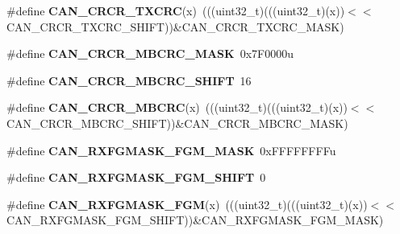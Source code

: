 \begin{DoxyCompactItemize}
\item 
\#define {\bfseries C\+A\+N\+\_\+\+C\+R\+C\+R\+\_\+\+T\+X\+C\+RC}(x)~(((uint32\+\_\+t)(((uint32\+\_\+t)(x))$<$$<$C\+A\+N\+\_\+\+C\+R\+C\+R\+\_\+\+T\+X\+C\+R\+C\+\_\+\+S\+H\+I\+FT))\&C\+A\+N\+\_\+\+C\+R\+C\+R\+\_\+\+T\+X\+C\+R\+C\+\_\+\+M\+A\+SK)\hypertarget{group__CAN__Register__Masks_ga2c7cb04502b4f8ab4f5e005dc3512ba2}{}\label{group__CAN__Register__Masks_ga2c7cb04502b4f8ab4f5e005dc3512ba2}

\item 
\#define {\bfseries C\+A\+N\+\_\+\+C\+R\+C\+R\+\_\+\+M\+B\+C\+R\+C\+\_\+\+M\+A\+SK}~0x7\+F0000u\hypertarget{group__CAN__Register__Masks_ga8b17ddaa608ead97f25b59e5919d079c}{}\label{group__CAN__Register__Masks_ga8b17ddaa608ead97f25b59e5919d079c}

\item 
\#define {\bfseries C\+A\+N\+\_\+\+C\+R\+C\+R\+\_\+\+M\+B\+C\+R\+C\+\_\+\+S\+H\+I\+FT}~16\hypertarget{group__CAN__Register__Masks_ga1d18c789e52dbae45dc581a3327a1bde}{}\label{group__CAN__Register__Masks_ga1d18c789e52dbae45dc581a3327a1bde}

\item 
\#define {\bfseries C\+A\+N\+\_\+\+C\+R\+C\+R\+\_\+\+M\+B\+C\+RC}(x)~(((uint32\+\_\+t)(((uint32\+\_\+t)(x))$<$$<$C\+A\+N\+\_\+\+C\+R\+C\+R\+\_\+\+M\+B\+C\+R\+C\+\_\+\+S\+H\+I\+FT))\&C\+A\+N\+\_\+\+C\+R\+C\+R\+\_\+\+M\+B\+C\+R\+C\+\_\+\+M\+A\+SK)\hypertarget{group__CAN__Register__Masks_gaab5690dca6900f95d513ea5178e1ad25}{}\label{group__CAN__Register__Masks_gaab5690dca6900f95d513ea5178e1ad25}

\item 
\#define {\bfseries C\+A\+N\+\_\+\+R\+X\+F\+G\+M\+A\+S\+K\+\_\+\+F\+G\+M\+\_\+\+M\+A\+SK}~0x\+F\+F\+F\+F\+F\+F\+F\+Fu\hypertarget{group__CAN__Register__Masks_ga5db0253c73d24a846f3f3ce6cd67e74c}{}\label{group__CAN__Register__Masks_ga5db0253c73d24a846f3f3ce6cd67e74c}

\item 
\#define {\bfseries C\+A\+N\+\_\+\+R\+X\+F\+G\+M\+A\+S\+K\+\_\+\+F\+G\+M\+\_\+\+S\+H\+I\+FT}~0\hypertarget{group__CAN__Register__Masks_ga65e590b20d692e367f4ee9dc8a4585e2}{}\label{group__CAN__Register__Masks_ga65e590b20d692e367f4ee9dc8a4585e2}

\item 
\#define {\bfseries C\+A\+N\+\_\+\+R\+X\+F\+G\+M\+A\+S\+K\+\_\+\+F\+GM}(x)~(((uint32\+\_\+t)(((uint32\+\_\+t)(x))$<$$<$C\+A\+N\+\_\+\+R\+X\+F\+G\+M\+A\+S\+K\+\_\+\+F\+G\+M\+\_\+\+S\+H\+I\+FT))\&C\+A\+N\+\_\+\+R\+X\+F\+G\+M\+A\+S\+K\+\_\+\+F\+G\+M\+\_\+\+M\+A\+SK)\hypertarget{group__CAN__Register__Masks_ga15b1e73fac26a60dd1247901ed012e02}{}\label{group__CAN__Register__Masks_ga15b1e73fac26a60dd1247901ed012e02}


\end{DoxyCompactItemize}
